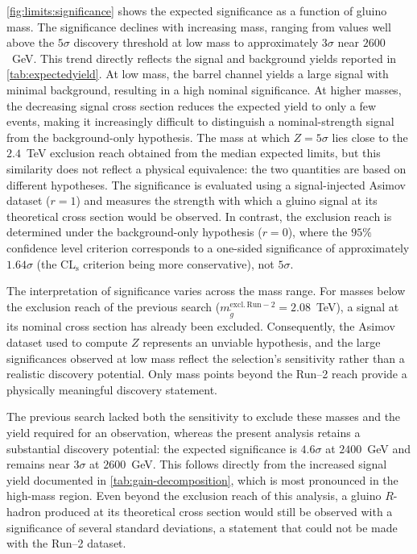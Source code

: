 \cref{fig:limits:significance} shows the expected significance as a function of gluino mass. The significance declines with increasing mass, ranging from values well above the $5\sigma$ discovery threshold at low mass to approximately $3\sigma$ near $2600$~GeV. This trend directly reflects the signal and background yields reported in \cref{tab:expectedyield}. At low mass, the barrel channel yields a large signal with minimal background, resulting in a high nominal significance. At higher masses, the decreasing signal cross section reduces the expected yield to only a few events, making it increasingly difficult to distinguish a nominal-strength signal from the background-only hypothesis. The mass at which $Z=5\sigma$ lies close to the $2.4$~TeV exclusion reach obtained from the median expected limits, but this similarity does not reflect a physical equivalence: the two quantities are based on different hypotheses. The significance is evaluated using a signal-injected Asimov dataset ($r=1$) and measures the strength with which a gluino signal at its theoretical cross section would be observed. In contrast, the exclusion reach is determined under the background-only hypothesis ($r=0$), where the $95\%$ confidence level criterion corresponds to a one-sided significance of approximately $1.64\sigma$ (the CL$_\mathrm{s}$ criterion being more conservative), not $5\sigma$.

The interpretation of significance varies across the mass range. For masses below the exclusion reach of the previous search ($m_{\tilde{g}}^{\mathrm{excl.\, Run-2}}=2.08$~TeV), a signal at its nominal cross section has already been excluded. Consequently, the Asimov dataset used to compute $Z$ represents an unviable hypothesis, and the large significances observed at low mass reflect the selection's sensitivity rather than a realistic discovery potential. Only mass points beyond the Run--2 reach provide a physically meaningful discovery statement.

The previous search lacked both the sensitivity to exclude these masses and the yield required for an observation, whereas the present analysis retains a substantial discovery potential: the expected significance is $4.6\sigma$ at $2400$~GeV and remains near $3\sigma$ at $2600$~GeV. This follows directly from the increased signal yield documented in \cref{tab:gain-decomposition}, which is most pronounced in the high-mass region. Even beyond the exclusion reach of this analysis, a gluino $R$-hadron produced at its theoretical cross section would still be observed with a significance of several standard deviations, a statement that could not be made with the Run--2 dataset.


